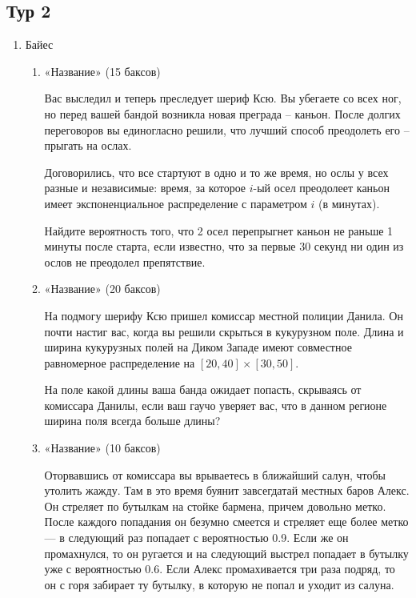 \documentclass[11pt, a4paper]{article}
\theoremstyle{definition}
\begin{document}
\subsection{Тур 2}
\begin{enumerate}
    \item Байес 
\begin{enumerate}
    \item «Название» (15 баксов)
    
    Вас выследил и теперь преследует шериф Ксю. Вы убегаете со всех ног, но перед вашей бандой возникла новая преграда – каньон. После долгих переговоров вы единогласно решили, что лучший способ преодолеть его – прыгать на ослах.
    
    Договорились, что все стартуют в одно и то же время, но ослы у всех разные и независимые: время, за которое $i$-ый осел преодолеет каньон имеет экспоненциальное распределение с параметром $i$ (в минутах).
    
    Найдите вероятность того, что 2 осел перепрыгнет каньон не раньше 1 минуты после старта, если известно, что за первые 30 секунд ни один из ослов не преодолел препятствие.

    \item «Название» (20 баксов)
    
    На подмогу шерифу Ксю пришел комиссар местной полиции Данила. Он почти настиг вас, когда вы решили скрыться в кукурузном поле. Длина и ширина кукурузных полей на Диком Западе имеют совместное равномерное распределение на $[20,40] \times [30,50]$.
    
    На поле какой длины ваша банда ожидает попасть, скрываясь от комиссара Данилы, если ваш гаучо уверяет вас, что в данном регионе ширина поля всегда больше длины?
    
    \item «Название» (10 баксов)
    
    Оторвавшись от комиссара вы врываетесь в ближайший салун, чтобы утолить жажду. Там в это время буянит завсегдатай местных баров Алекс. Он стреляет по бутылкам на стойке бармена, причем довольно метко. После каждого попадания он безумно смеется и стреляет еще более метко — в следующий раз попадает с вероятностью 0.9. Если же он промахнулся, то он ругается и на следующий выстрел попадает в бутылку уже с вероятностью 0.6. Если Алекс промахивается три раза подряд, то он с горя забирает ту бутылку, в которую не попал и уходит из салуна.
    

\end{enumerate}
\end{enumerate}
\end{document}
